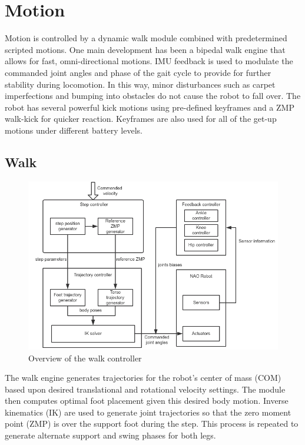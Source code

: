 \documentclass{article}
\begin{document}
\section{Motion}
	Motion is controlled by a dynamic walk module combined with predetermined scripted motions. One main development has been a bipedal walk engine that allows for fast, omni-directional motions. IMU feedback is used to modulate the commanded joint angles and phase of the gait cycle to provide for further stability during locomotion. In this way, minor disturbances such as carpet imperfections and bumping into obstacles do not cause the robot to fall over. The robot has several powerful kick motions using pre-defined keyframes and a ZMP walk-kick for quicker reaction. Keyframes are also used for all of the get-up motions under different battery levels.

\subsection{Walk}

	\begin{figure}[H]
		\centering
		\includegraphics[width=1\textwidth]{figures/WalkOverView.png}
		\caption{Overview of the walk controller}
	\end{figure}

	The walk engine generates trajectories for the robot's center of mass (COM) based upon desired translational and rotational velocity settings. The module then computes optimal foot placement given this desired body motion. Inverse kinematics (IK) are used to generate joint trajectories so that the zero moment point (ZMP) is over the support foot during the step. This process is repeated to generate alternate support and swing phases for both legs.
\end{document}
